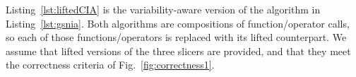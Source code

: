 %	
%	
%	
%	
%	
%	




Listing~\ref{lst:liftedCIA} is the variability-aware version of the algorithm in Listing~\ref{lst:gsnia}. Both algorithms are compositions of function/operator calls, so each of those functions/operators is replaced with its lifted counterpart. We assume that lifted versions of the three slicers are provided, and that they meet the correctness criteria of Fig.~\ref{fig:correctness1}. 

